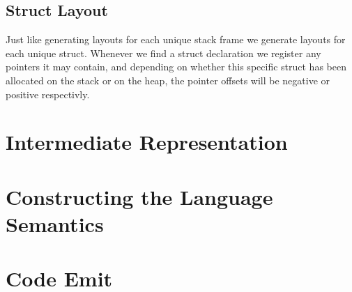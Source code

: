 \subsection{Struct Layout}

Just like generating layouts for each unique stack frame we generate layouts for each unique struct. Whenever we find a struct declaration we register any pointers it may contain, and depending on whether this specific struct has been allocated on the stack or on the heap, the pointer offsets will be negative or positive respectivly. 

\section{Intermediate Representation}

\section{Constructing the Language Semantics}

\section{Code Emit}